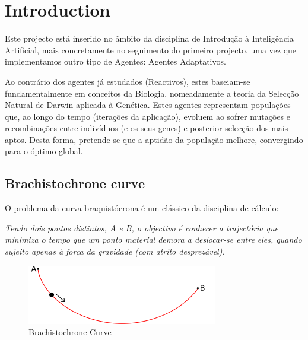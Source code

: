 \documentclass[a4paper]{article}
\title{\documentTitle}
\author{\documentAuthors{}}
\begin{document}
\renewcommand{\figurename}{Figure}
\maketitle
\cleardoublepage

\tableofcontents
\cleardoublepage

\setlength{\parindent}{1cm}
\setlength{\parskip}{0.3cm}

\section{Introduction}
\indent \indent Este projecto está inserido no âmbito da disciplina de Introdução à Inteligência Artificial,
mais concretamente no seguimento do primeiro projecto, uma vez que implementamos outro tipo de Agentes: Agentes Adaptativos.

Ao contrário dos agentes já estudados (Reactivos), estes baseiam-se fundamentalmente em conceitos da Biologia, nomeadamente a teoria da Selecção Natural de Darwin aplicada à Genética.
Estes agentes representam populações que, ao longo do tempo (iterações da aplicação), evoluem ao sofrer mutações e recombinações entre indivíduos (e os seus genes) e posterior selecção dos mais aptos.
Desta forma, pretende-se que a aptidão da população melhore, convergindo para o óptimo global.

\subsection{Brachistochrone curve}

\indent \indent O problema da curva braquistócrona é um clássico da disciplina de cálculo:

\emph{Tendo dois pontos distintos, A e B, o objectivo é conhecer a trajectória que minimiza o tempo que um ponto material demora a deslocar-se entre eles, quando sujeito apenas à força da gravidade (com atrito desprezável).}

\begin{figure}[ht]
	\centering
	\includegraphics[scale=0.5]{images/Brachistochrone.png}
	\caption{Brachistochrone Curve}
	\label{fig:brachistochrone}
\end{figure}
\end{document}

